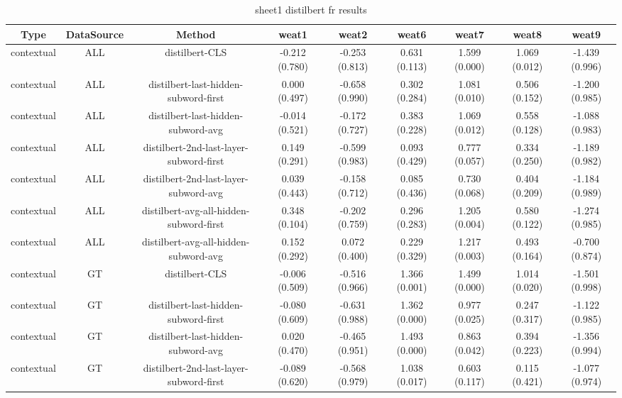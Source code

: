 \begin{sidewaystable}[htb]
    \centering
    \caption{sheet1 distilbert fr results}
    \label{appendix_tab:sheet1_distilbert_fr_results}
    \small
    \begin{tabular}{@{}ccccccccc@{}}
        \toprule
        Type & DataSource & Method & weat1 & weat2 & weat6 & weat7 & weat8 & weat9 \\
        \midrule
        contextual & ALL & distilbert-CLS & -0.212 (0.780) & -0.253 (0.813) & 0.631 (0.113) & 1.599 (0.000) & 1.069 (0.012) & -1.439 (0.996) \\
        contextual & ALL & distilbert-last-hidden-subword-first & 0.000 (0.497) & -0.658 (0.990) & 0.302 (0.284) & 1.081 (0.010) & 0.506 (0.152) & -1.200 (0.985) \\
        contextual & ALL & distilbert-last-hidden-subword-avg & -0.014 (0.521) & -0.172 (0.727) & 0.383 (0.228) & 1.069 (0.012) & 0.558 (0.128) & -1.088 (0.983) \\
        contextual & ALL & distilbert-2nd-last-layer-subword-first & 0.149 (0.291) & -0.599 (0.983) & 0.093 (0.429) & 0.777 (0.057) & 0.334 (0.250) & -1.189 (0.982) \\
        contextual & ALL & distilbert-2nd-last-layer-subword-avg & 0.039 (0.443) & -0.158 (0.712) & 0.085 (0.436) & 0.730 (0.068) & 0.404 (0.209) & -1.184 (0.989) \\
        contextual & ALL & distilbert-avg-all-hidden-subword-first & 0.348 (0.104) & -0.202 (0.759) & 0.296 (0.283) & 1.205 (0.004) & 0.580 (0.122) & -1.274 (0.985) \\
        contextual & ALL & distilbert-avg-all-hidden-subword-avg & 0.152 (0.292) & 0.072 (0.400) & 0.229 (0.329) & 1.217 (0.003) & 0.493 (0.164) & -0.700 (0.874) \\
        contextual & GT & distilbert-CLS & -0.006 (0.509) & -0.516 (0.966) & 1.366 (0.001) & 1.499 (0.000) & 1.014 (0.020) & -1.501 (0.998) \\
        contextual & GT & distilbert-last-hidden-subword-first & -0.080 (0.609) & -0.631 (0.988) & 1.362 (0.000) & 0.977 (0.025) & 0.247 (0.317) & -1.122 (0.985) \\
        contextual & GT & distilbert-last-hidden-subword-avg & 0.020 (0.470) & -0.465 (0.951) & 1.493 (0.000) & 0.863 (0.042) & 0.394 (0.223) & -1.356 (0.994) \\
        contextual & GT & distilbert-2nd-last-layer-subword-first & -0.089 (0.620) & -0.568 (0.979) & 1.038 (0.017) & 0.603 (0.117) & 0.115 (0.421) & -1.077 (0.974) \\

\end{tabular}
\end{sidewaystable}
